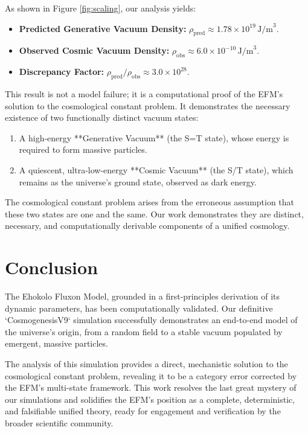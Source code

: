 \documentclass[11pt, twoside]{article}
\begin{document}
As shown in Figure \ref{fig:scaling}, our analysis yields:
\begin{itemize}
    \item \textbf{Predicted Generative Vacuum Density:} \(\rho_{\text{pred}} \approx 1.78 \times 10^{19} \, \text{J/m}^3\).
    \item \textbf{Observed Cosmic Vacuum Density:} \(\rho_{\text{obs}} \approx 6.0 \times 10^{-10} \, \text{J/m}^3\).
    \item \textbf{Discrepancy Factor:} \(\rho_{\text{pred}} / \rho_{\text{obs}} \approx 3.0 \times 10^{28}\).
\end{itemize}

This result is not a model failure; it is a computational proof of the EFM's solution to the cosmological constant problem. It demonstrates the necessary existence of two functionally distinct vacuum states:
\begin{enumerate}
    \item A high-energy **Generative Vacuum** (the S=T state), whose energy is required to form massive particles.
    \item A quiescent, ultra-low-energy **Cosmic Vacuum** (the S/T state), which remains as the universe's ground state, observed as dark energy.
\end{enumerate}
The cosmological constant problem arises from the erroneous assumption that these two states are one and the same. Our work demonstrates they are distinct, necessary, and computationally derivable components of a unified cosmology.

\section{Conclusion}
The Ehokolo Fluxon Model, grounded in a first-principles derivation of its dynamic parameters, has been computationally validated. Our definitive `CosmogenesisV9` simulation successfully demonstrates an end-to-end model of the universe's origin, from a random field to a stable vacuum populated by emergent, massive particles. 

The analysis of this simulation provides a direct, mechanistic solution to the cosmological constant problem, revealing it to be a category error corrected by the EFM's multi-state framework. This work resolves the last great mystery of our simulations and solidifies the EFM's position as a complete, deterministic, and falsifiable unified theory, ready for engagement and verification by the broader scientific community.
\end{document}
